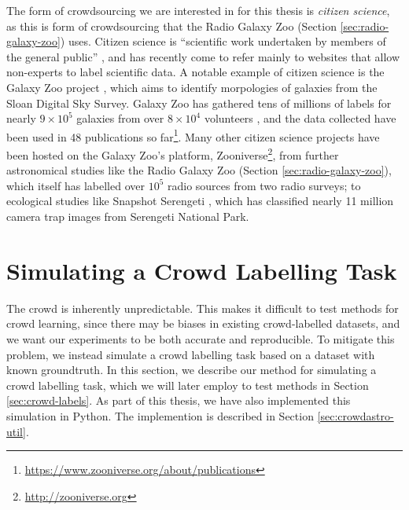     The form of crowdsourcing we are interested in for this thesis is
    \emph{citizen science}, as this is form of crowdsourcing that the Radio
    Galaxy Zoo (Section \ref{sec:radio-galaxy-zoo}) uses. Citizen science is
    ``scientific work undertaken by members of the general public''
    \citep{oed-citizenscience, marshall15}, and has recently come to refer
    mainly to websites that allow non-experts to label scientific data. A
    notable example of citizen science is the Galaxy Zoo project
    \citep{lintott08}, which aims to identify morpologies of galaxies from the
    Sloan Digital Sky Survey. Galaxy Zoo has gathered tens of millions of labels
    for nearly $9 \times 10^5$ galaxies from over $8 \times 10^4$ volunteers
    \citep{lintott11}, and the data collected have been used in 48 publications
    so far\footnote{\url{https://www.zooniverse.org/about/publications}}. Many
    other citizen science projects have been hosted on the Galaxy Zoo's
    platform, Zooniverse\footnote{\url{http://zooniverse.org}}, from further
    astronomical studies like the Radio Galaxy Zoo \citep{banfield15} (Section
    \ref{sec:radio-galaxy-zoo}), which itself has labelled over $10^5$ radio
    sources from two radio surveys; to ecological studies like Snapshot
    Serengeti \citep{swanson15}, which has classified nearly 11 million camera
    trap images from Serengeti National Park.


\section{Simulating a Crowd Labelling Task}
\label{sec:crowd-simulation}

    The crowd is inherently unpredictable. This makes it difficult to test
    methods for crowd learning, since there may be biases in existing
    crowd-labelled datasets, and we want our experiments to be both accurate and
    reproducible. To mitigate this problem, we instead simulate a crowd
    labelling task based on a dataset with known groundtruth. In this section,
    we describe our method for simulating a crowd labelling task, which we will
    later employ to test methods in Section \ref{sec:crowd-labels}. As part of
    this thesis, we have also implemented this simulation in Python. The
    implemention is described in Section \ref{sec:crowdastro-util}.

